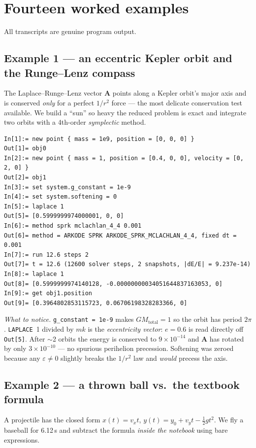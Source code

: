 \documentclass[11pt]{article}
\newcommand{\kw}[1]{\texttt{\uppercase{#1}}}
\newcommand{\code}[1]{\texttt{#1}}
\begin{document}
\section{Fourteen worked examples}

All transcripts are genuine program output.

\subsection{Example 1 --- an eccentric Kepler orbit and the Runge--Lenz compass}

The Laplace--Runge--Lenz vector $\mathbf A$ points along a Kepler
orbit's major axis and is conserved \emph{only} for a perfect $1/r^2$
force --- the most delicate conservation test available. We build a
``sun'' so heavy the reduced problem is exact and integrate two orbits
with a 4th-order \emph{symplectic} method.

\begin{lstlisting}
In[1]:= new point { mass = 1e9, position = [0, 0, 0] }
Out[1]= obj0
In[2]:= new point { mass = 1, position = [0.4, 0, 0], velocity = [0, 2, 0] }
Out[2]= obj1
In[3]:= set system.g_constant = 1e-9
In[4]:= set system.softening = 0
In[5]:= laplace 1
Out[5]= [0.5999999974000001, 0, 0]
In[6]:= method sprk mclachlan_4_4 0.001
Out[6]= method = ARKODE SPRK ARKODE_SPRK_MCLACHLAN_4_4, fixed dt = 0.001
In[7]:= run 12.6 steps 2
Out[7]= t = 12.6 (12600 solver steps, 2 snapshots, |dE/E| = 9.237e-14)
In[8]:= laplace 1
Out[8]= [0.5999999974140128, -0.00000000034051644837163053, 0]
In[9]:= get obj1.position
Out[9]= [0.3964802853115723, 0.06706198328283366, 0]
\end{lstlisting}

\emph{What to notice.} \code{g\_constant = 1e-9} makes
$G M_{\text{total}} = 1$ so the orbit has period $2\pi$. \kw{laplace}~1
divided by $mk$ is the \emph{eccentricity vector}: $e = 0.6$ is read
directly off \code{Out[5]}. After $\sim$2 orbits the energy is conserved
to $9\times10^{-14}$ and $\mathbf A$ has rotated by only
$3\times10^{-10}$ --- no spurious perihelion precession. Softening was
zeroed because any $\varepsilon\ne 0$ slightly breaks the $1/r^2$ law
and \emph{would} precess the axis.

\subsection{Example 2 --- a thrown ball vs.\ the textbook formula}

A projectile has the closed form $x(t)=v_x t$,
$y(t)=y_0+v_y t-\tfrac12 g t^2$. We fly a baseball for 6.12\,s and
subtract the formula \emph{inside the notebook} using bare expressions.
\end{document}
